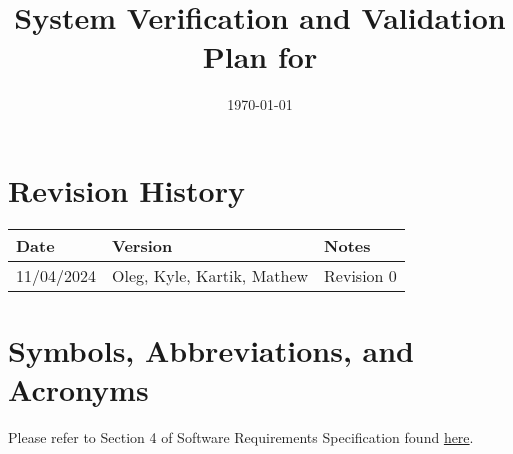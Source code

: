 \documentclass[12pt, titlepage]{article}
\begin{document}
\title{System Verification and Validation Plan for \progname{}}  
\author{\authname}
\date{\today}
	
\maketitle


\section*{Revision History}

\begin{tabularx}{\textwidth}{p{3cm}p{2cm}X}
\toprule {\bf Date} & {\bf Version} & {\bf Notes}\\
\midrule
11/04/2024 & Oleg, Kyle, Kartik, Mathew & Revision 0\\
\bottomrule
\end{tabularx}



\newpage

\tableofcontents

\newpage

\section{Symbols, Abbreviations, and Acronyms}

Please refer to Section 4 of Software Requirements Specification found \href{https://github.com/OKKM-insights/OKKM.insights/blob/main/docs/SRS/SRS.pdf}{here}.
\end{document}

